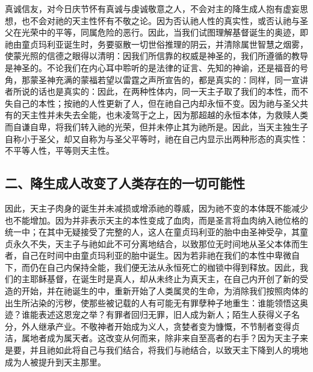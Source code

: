 真诚信友，对今日庆节怀有真诚与虔诚敬意之人，不会对主的降生成人抱有虚妄思想，也不会对祂的天主性怀有不敬之论。因为否认祂人性的真实性，或否认祂与圣父在光荣中的平等，同属危险的恶行。因此，当我们试图理解基督诞生的奥迹，即祂由童贞玛利亚诞生时，务要驱散一切世俗推理的阴云，并清除属世智慧之烟雾，使蒙光照的信德之眼得以清明：因我们所信靠的权威是神圣的，我们所遵循的教导是神圣的。不论我们在内心耳中聆听的是法律的证言、先知的神谕，还是福音的号角，那蒙圣神充满的蒙福若望以雷霆之声所宣告的，都是真实的：同样，同一宣讲者所说的话也是真实的：因此，在两种性体内，同一天主子取了我们的本性，而不失自己的本性；按祂的人性更新了人，但在祂自己内却永恒不变。因为祂与圣父共有的天主性并未失去全能，也未凌驾于之上，因为那超越的永恒本体，为救赎人类而自谦自卑，将我们转入祂的光荣，但并未停止其为祂所是。因此，当天主独生子自称小于圣父，却又自称为与圣父平等时，祂在自己内显示出两种形态的真实性：不平等人性，平等则天主性。\par


\subsection{二、降生成人改变了人类存在的一切可能性}

因此，天主子肉身的诞生并未减损或增添祂的尊威，因为祂不变的本体既不能减少也不能增加。因为并非表示天主的本性变成了血肉，而是圣言将血肉纳入祂位格的统一中；在其中无疑接受了完整的人，这人在童贞玛利亚的胎中由圣神受孕，其童贞永久不失，天主子与祂如此不可分离地结合，以致那位无时间地从圣父本体而生者，自己在时间中由童贞玛利亚的胎中诞生。因为若非祂在我们的本性中卑微自下，而仍在自己内保持全能，我们便无法从永恒死亡的枷锁中得到释放。因此，我们的主耶稣基督，在诞生时是真人，却从未终止为真天主，在自己内开创了新的受造的开始，并在祂诞生的中，重新开始了人类属灵的生命，为消除我们按照肉体的出生所沾染的污秽，使那些被记载的人有可能无有罪孽种子地重生：谁能领悟这奥迹？谁能表述这恩宠之举？有罪者回归无罪，旧人成为新人；陌生人获得义子名分，外人继承产业。不敬神者开始成为义人，贪婪者变为慷慨，不节制者变得贞洁，属地者成为属天者。这改变从何而来，除非来自至高者的右手？因为天主子来是要，并且祂如此将自己与我们结合，将我们与祂结合，以致天主下降到人的境地成为人被提升到天主那里。\par

